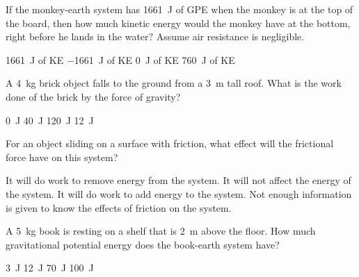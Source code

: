 \documentclass[answers]{exam}
\begin{document}
\begin{questions}
\begin{center}
\end{center}

If the monkey-earth system has \SI{1661}{J} of GPE when the monkey is at the top of the board, then how much kinetic energy would the monkey have at the bottom, right before he lands in the water? Assume air resistance is negligible.

\begin{randomizechoices}[norandomize]
    \correctchoice \SI{1661}{J} of KE
    \choice \SI{-1661}{J} of KE
    \choice \SI{0}{J} of KE
    \choice \SI{760}{J} of KE
\end{randomizechoices}

\question
A \SI{4}{kg} brick object falls to the ground from a \SI{3}{m} tall roof. What is the work done of the brick by the force of gravity?

\begin{randomizechoices}[norandomize]
    \choice \SI{0}{J}
    \choice \SI{40}{J}
    \correctchoice \SI{120}{J}
    \choice \SI{12}{J}
\end{randomizechoices}

\question 
For an object sliding on a surface with friction, what effect will the frictional force have on this system?

\begin{randomizechoices}[norandomize]
    \correctchoice It will do work to remove energy from the system.
    \choice It will not affect the energy of the system.
    \choice It will do work to add energy to the system.
    \choice Not enough information is given to know the effects of friction on the system.
\end{randomizechoices}

\question
A \SI{5}{kg} book is resting on a shelf that is \SI{2}{m} above the floor. How much gravitational potential energy does the book-earth system have?

\begin{randomizeoneparchoices}[norandomize]
    \choice \SI{3}{J}
    \choice \SI{12}{J}
    \choice \SI{70}{J}
    \correctchoice \SI{100}{J}
\end{randomizeoneparchoices}


\end{questions}
\end{document}
